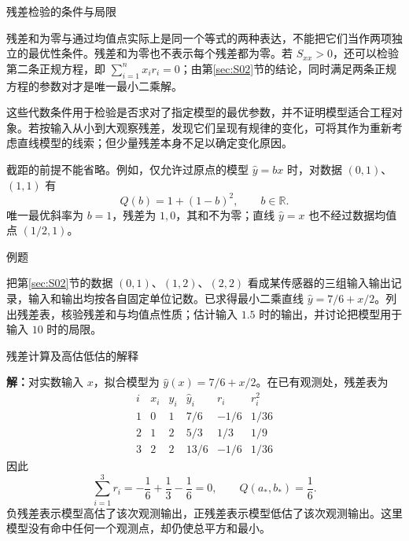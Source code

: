 \documentclass[aspectratio=169,10pt,fontset=fandol]{ctexbeamer}
\begin{document}
\begin{frame}[t,fragile]{残差检验的条件与局限}
\normalsize
{\normalsize
残差和为零与通过均值点实际上是同一个等式的两种表达，不能把它们当作两项独立的最优性条件。残差和为零也不表示每个残差都为零。若 $S_{xx}>0$，还可以检验第二条正规方程，即 $\sum_{i=1}^{n}x_i r_i=0$；由第\ref{sec:S02}节的结论，同时满足两条正规方程的参数对才是唯一最小二乘解。


}
{\normalsize
这些代数条件用于检验是否求对了指定模型的最优参数，并不证明模型适合工程对象。若按输入从小到大观察残差，发现它们呈现有规律的变化，可将其作为重新考虑直线模型的线索；但少量残差本身不足以确定变化原因。


}
{\normalsize
截距的前提不能省略。例如，仅允许过原点的模型 $\hat{y}=bx$ 时，对数据 $(0,1)$、$(1,1)$ 有
\[
Q(b)=1+(1-b)^2,\qquad b\in\mathbb{R}.
\]
唯一最优斜率为 $b=1$，残差为 $1,0$，其和不为零；直线 $\hat{y}=x$ 也不经过数据均值点 $(1/2,1)$。\par

}
\begin{block}{例题}
{\normalsize
把第\ref{sec:S02}节的数据 $(0,1)$、$(1,2)$、$(2,2)$ 看成某传感器的三组输入输出记录，输入和输出均按各自固定单位记数。已求得最小二乘直线 $\hat{y}=7/6+x/2$。列出残差表，核验残差和与均值点性质；估计输入 $1.5$ 时的输出，并讨论把模型用于输入 $10$ 时的局限。

}
\end{block}
\end{frame}
\begin{frame}[t,fragile]{残差计算及高估低估的解释}
\footnotesize
{\footnotesize
\par\noindent\textbf{解：}对实数输入 $x$，拟合模型为 $\hat{y}(x)=7/6+x/2$。在已有观测处，残差表为
\[
\begin{array}{c|r|r|r|r|r}
i&x_i&y_i&\hat{y}_i&r_i&r_i^2\\ \hline
1&0&1&7/6&-1/6&1/36\\
2&1&2&5/3&1/3&1/9\\
3&2&2&13/6&-1/6&1/36
\end{array}
\]
因此
\[
\sum_{i=1}^{3}r_i=-\frac16+\frac13-\frac16=0,
\qquad Q(a_*,b_*)=\frac16.
\]
负残差表示模型高估了该次观测输出，正残差表示模型低估了该次观测输出。这里模型没有命中任何一个观测点，却仍使总平方和最小。


}
\end{frame}
\end{document}
